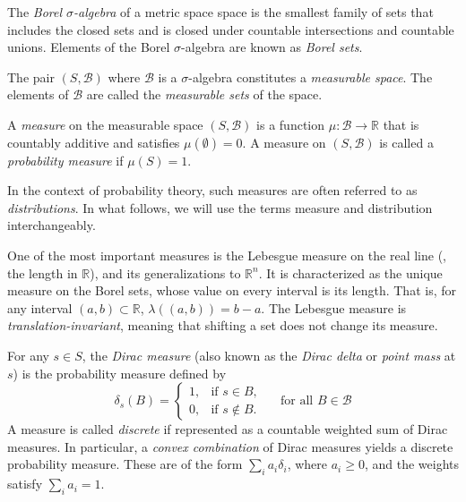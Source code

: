 \begin{definition}
  The \emph{Borel $\sigma$-algebra} of a metric space space is the smallest family
 of sets that includes  the closed sets and is closed under countable intersections and countable unions. Elements of the Borel
 $\sigma$-algebra are known as \emph{Borel sets}. 
\end{definition}

\begin{definition} 
  The pair $(S, \mathcal{B})$ where $\mathcal{B}$ is a $\sigma$-algebra constitutes a \emph{measurable space}. The elements of $\mathcal{B}$ are called  the \emph{measurable sets} of the space. 
\end{definition}



\begin{definition} 
  A  \emph{measure} on the measurable space $(S,\mathcal{B})$ is a function $\mu: \mathcal{B} \to  \mathbb{R} $ that is countably additive and satisfies $\mu(\emptyset)=0$. A measure  on $(S,\mathcal{B})$ is called a \emph{probability measure} if $\mu(S) = 1$.
\end{definition}

 In the context of probability theory, such measures are often referred to as \emph{distributions}. In what follows, we will use the terms measure and distribution interchangeably.

 

 One of the most important measures is the Lebesgue measure on the real line (\ie, the length in $\mathbb{R}$), and its generalizations to $\mathbb{R}^n$.  It is characterized as the unique measure on the Borel sets, whose value on every interval is its length. That is, for any interval $(a, b) \subset \mathbb{R}$,
$
\lambda((a, b)) = b - a.$ The Lebesgue measure is \emph{translation-invariant}, meaning that shifting a set does not change its measure.

For any $ s \in S $, the \emph{Dirac measure} (also known as the \emph{Dirac delta} or \emph{point mass} at \( s \)) is the probability measure defined by
$$
\delta_s(B) =
\begin{cases}
1, & \text{if } s \in B, \\
0, & \text{if } s \notin B.
\end{cases} \quad \text{ for all } B \in \mathcal{B}
$$
A measure is called \emph{discrete} if represented as a countable weighted sum of Dirac measures. In particular, a \emph{convex combination} of Dirac measures yields a discrete probability measure. These are of the form $\sum_{i} a_i \delta_i$,
where $ a_i \geq 0 $, and the weights satisfy $ \sum_{i} a_i = 1 $.

